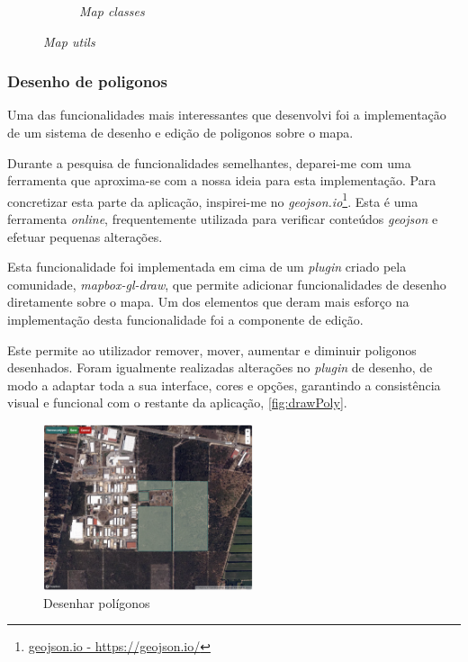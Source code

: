 \begin{figure}[!h]
\begin{subfigure}[c]{0.40\textwidth}
		\caption{\textit{Map classes}}
		\label{fig:mapClasses}
	\end{subfigure}
	\caption{\textit{Map utils}}
    \label{fig:mapUtils}
\end{figure}


\clearpage
\subsubsection{\textbf{Desenho de poligonos}}\label{sec:polyDraw}
Uma das funcionalidades mais interessantes que desenvolvi foi a implementação de um sistema de desenho e edição de poligonos sobre o mapa.

Durante a pesquisa de funcionalidades semelhantes, deparei-me com uma ferramenta que aproxima-se com a nossa ideia para esta implementação. Para concretizar esta parte da aplicação, inspirei-me no \textit{geojson.io}\footnote{\href{https://geojson.io/}{geojson.io - https://geojson.io/}}. Esta é uma ferramenta \textit{online}, frequentemente utilizada para verificar conteúdos \textit{geojson} e efetuar pequenas alterações.

Esta funcionalidade foi implementada em cima de um \textit{plugin} criado pela comunidade, \textit{mapbox-gl-draw}\cite{mapbox.docs.url}, que permite adicionar funcionalidades de desenho diretamente sobre o mapa. Um dos elementos que deram mais esforço na implementação desta funcionalidade foi a componente de edição. 

Este permite ao utilizador remover, mover, aumentar e diminuir poligonos desenhados. Foram igualmente realizadas alterações no \textit{plugin} de desenho, de modo a adaptar toda a sua interface, cores e opções, garantindo a consistência visual e funcional com o restante da aplicação, \autoref{fig:drawPoly}.

\begin{figure}[h!]
    \centering
    \includegraphics[width=0.55\textwidth]{figs/draw.png}
    \caption{Desenhar polígonos}
    \label{fig:drawPoly}
\end{figure}

